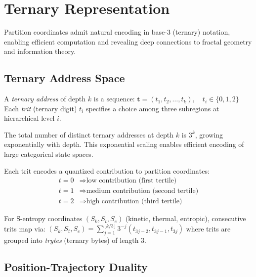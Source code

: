 \section{Ternary Representation}
\label{sec:ternary}

Partition coordinates admit natural encoding in base-3 (ternary) notation, enabling efficient computation and revealing deep connections to fractal geometry and information theory.

\subsection{Ternary Address Space}

\begin{definition}
\label{def:ternary}
A \emph{ternary address} of depth $k$ is a sequence:
$
\mathbf{t} = (t_1, t_2, \ldots, t_k), \quad t_i \in \{0, 1, 2\}
$
Each \emph{trit} (ternary digit) $t_i$ specifies a choice among three subregions at hierarchical level $i$.
\end{definition}

\begin{remark}
The total number of distinct ternary addresses at depth $k$ is $3^k$, growing exponentially with depth. This exponential scaling enables efficient encoding of large categorical state spaces.
\end{remark}

\begin{definition}
\label{def:trit_map}
Each trit encodes a quantized contribution to partition coordinates:
\begin{align}
t = 0 &\Rightarrow \text{low contribution (first tertile)} \\
t = 1 &\Rightarrow \text{medium contribution (second tertile)} \\
t = 2 &\Rightarrow \text{high contribution (third tertile)}
\end{align}
\end{definition}

For S-entropy coordinates $(S_k, S_t, S_e)$ (kinetic, thermal, entropic), consecutive trits map via:
$
(S_k, S_t, S_e) = \sum_{j=1}^{\lfloor k/3 \rfloor} 3^{-j} (t_{3j-2}, t_{3j-1}, t_{3j})
$
where trits are grouped into \emph{trytes} (ternary bytes) of length 3.

\subsection{Position-Trajectory Duality}

